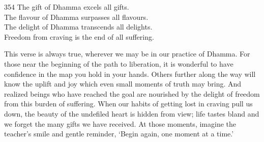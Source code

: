 
\begin{dhpVerse}{354}
\label{dhp-354}
The gift of Dhamma excels all gifts.\\
The flavour of Dhamma surpasses all flavours.\\
The delight of Dhamma transcends all delights.\\
Freedom from craving is the end of all suffering.
\end{dhpVerse}

\begin{dhpRefl}
This verse is always true, wherever we may be in our practice of Dhamma. For those near the beginning of the path to liberation, it is wonderful to have confidence in the map you hold in your hands. Others further along the way will know the uplift and joy which even small moments of truth may bring. And realized beings who have reached the goal are nourished by the delight of freedom from this burden of suffering. When our habits of getting lost in craving pull us down, the beauty of the undefiled heart is hidden from view; life tastes bland and we forget the many gifts we have received. At those moments, imagine the teacher's smile and gentle reminder, `Begin again, one moment at a time.'
\end{dhpRefl}


